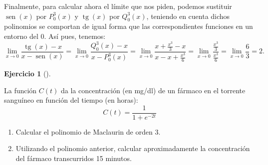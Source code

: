 \documentclass[
  a4paper,
]{scrreport}
\providecommand{\tightlist}{%
  \setlength{\itemsep}{0pt}\setlength{\parskip}{0pt}}\usepackage{longtable,booktabs,array}
\theoremstyle{definition}
\newtheorem{exercise}{Ejercicio}[chapter]
\theoremstyle{remark}
\begin{document}
\begin{tcolorbox}
Finalmente, para calcular ahora el límite que nos piden, podemos
sustituir \(\operatorname{sen}(x)\) por \(P_{0}^{3}(x)\) y
\(\operatorname{tg}(x)\) por \(Q_{0}^{3}(x)\), teniendo en cuenta dichos
polinomios se comportan de igual forma que las correspondientes
funciones en un entorno del 0. Así pues, tenemos: \[
\lim_{x\rightarrow 0}\frac{\operatorname{tg}(x)-x}{x-\operatorname{sen}(x)} = \lim_{x\rightarrow 0}\frac{Q_{0}^{3}(x)-x}{x-P_{0}^{3}(x)} = \lim_{x\rightarrow 0}\frac{x+\frac{x^{3}}{3}-x}{x-x+\frac{x^{3}}{6}} = \lim_{x\rightarrow 0}\frac{\frac{x^{3}}{3}}{\frac{x^{3}}{6}} = \lim_{x\rightarrow 0}\frac{6}{3}=2.
\]

\end{tcolorbox}

\begin{exercise}[]\protect\hypertarget{exr-taylor-5}{}\label{exr-taylor-5}

La función \(C(t)\) da la concentración (en mg/dl) de un fármaco en el
torrente sanguíneo en función del tiempo (en horas): \[
C(t) = \frac{1}{{1 + e^{-2t}}}
\]

\begin{enumerate}
\def\labelenumi{\alph{enumi}.}
\tightlist
\item
  Calcular el polinomio de Maclaurin de orden 3.
\item
  Utilizando el polinomio anterior, calcular aproximadamente la
  concentración del fármaco transcurridos 15 minutos.
\end{enumerate}

\end{exercise}
\end{document}
